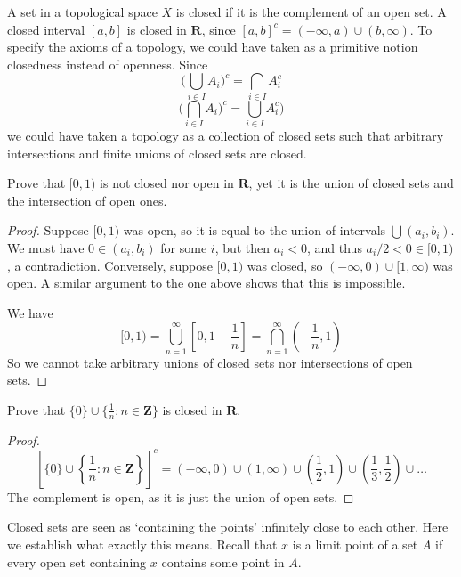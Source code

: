 A set in a topological space $X$ is closed if it is the complement of an open set. A closed interval $[a,b]$ is closed in $\mathbf{R}$, since $[a,b]^c = (-\infty, a) \cup (b,\infty)$. To specify the axioms of a topology, we could have taken as a primitive notion closedness instead of openness. Since
%
\[ \big( \bigcup_{i \in I} A_i \big)^c = \bigcap_{i \in I} A_i^c \]
%
\[ \big( \bigcap_{i \in I} A_i \big)^c = \bigcup_{i \in I} A_i^c \big) \]
%
we could have taken a topology as a collection of closed sets such that arbitrary intersections and finite unions of closed sets are closed.

\begin{exercise}
    Prove that $[0,1)$ is not closed nor open in $\mathbf{R}$, yet it is the union of closed sets and the intersection of open ones.
\end{exercise}
\begin{proof}
    Suppose $[0,1)$ was open, so it is equal to the union of intervals $\bigcup (a_i,b_i)$. We must have $0 \in (a_i, b_i)$ for some $i$, but then $a_i < 0$, and thus $a_i/2 < 0 \in [0,1)$, a contradiction. Conversely, suppose $[0,1)$ was closed, so $(-\infty, 0) \cup [1,\infty)$ was open. A similar argument to the one above shows that this is impossible.

    We have
    \[ [0,1) = \bigcup_{n = 1}^\infty \left[0, 1 - \frac{1}{n} \right] = \bigcap_{n = 1}^\infty (-\frac{1}{n}, 1) \]
    So we cannot take arbitrary unions of closed sets nor intersections of open sets.
\end{proof}

\begin{exercise}
    Prove that $\{0\} \cup \{ \frac{1}{n} : n \in \mathbf{Z} \}$ is closed in $\mathbf{R}$.
\end{exercise}
\begin{proof}
    \[ \left[\{0\} \cup \left\{ \frac{1}{n} : n \in \mathbf{Z} \right\}\right]^c = (-\infty, 0) \cup (1, \infty) \cup \left(\frac{1}{2},1\right) \cup \left(\frac{1}{3},\frac{1}{2}\right) \cup \dots \]
    The complement is open, as it is just the union of open sets.
\end{proof}

Closed sets are seen as `containing the points' infinitely close to each other. Here we establish what exactly this means. Recall that $x$ is a limit point of a set $A$ if every open set containing $x$ contains some point in $A$.


